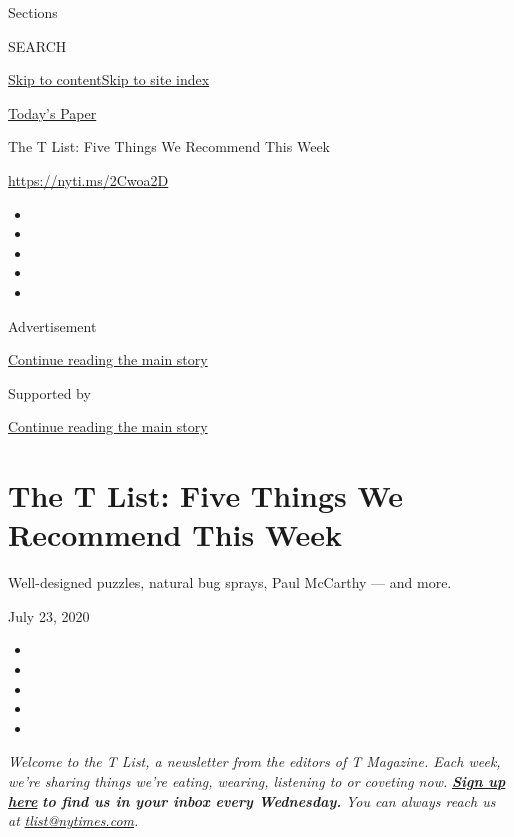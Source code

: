 Sections

SEARCH

\protect\hyperlink{site-content}{Skip to
content}\protect\hyperlink{site-index}{Skip to site index}

\href{https://myaccount.nytimes.com/auth/login?response_type=cookie\&client_id=vi}{}

\href{https://www.nytimes.com/section/todayspaper}{Today's Paper}

The T List: Five Things We Recommend This Week

\url{https://nyti.ms/2Cwoa2D}

\begin{itemize}
\item
\item
\item
\item
\item
\end{itemize}

Advertisement

\protect\hyperlink{after-top}{Continue reading the main story}

Supported by

\protect\hyperlink{after-sponsor}{Continue reading the main story}

\hypertarget{the-t-list-five-things-we-recommend-this-week}{%
\section{The T List: Five Things We Recommend This
Week}\label{the-t-list-five-things-we-recommend-this-week}}

Well-designed puzzles, natural bug sprays, Paul McCarthy --- and more.

July 23, 2020

\begin{itemize}
\item
\item
\item
\item
\item
\end{itemize}

\emph{Welcome to the T List, a newsletter from the editors of T
Magazine. Each week, we're sharing things we're eating, wearing,
listening to or coveting now.}
\textbf{\href{https://www.nytimes.com/newsletters/t-list?module=inline}{\emph{Sign
up here}}} \emph{\textbf{to find us in your inbox every Wednesday.}}
\emph{You can always reach us at}
\href{mailto:tlist@nytimes.com}{\emph{tlist@nytimes.com}}\emph{.}

